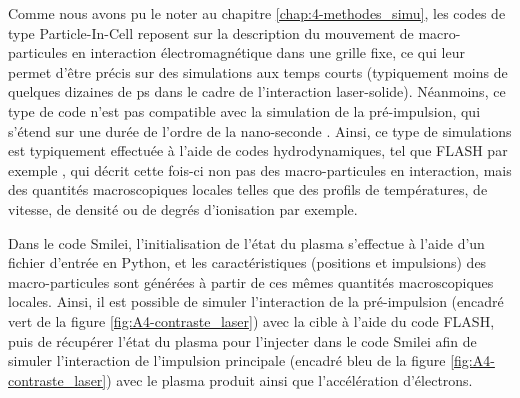 Comme nous avons pu le noter au chapitre \ref{chap:4-methodes_simu}, les codes de type Particle-In-Cell reposent sur la description du mouvement de macro-particules en interaction électromagnétique dans une grille fixe, ce qui leur permet d'être précis sur des simulations aux temps courts (typiquement moins de quelques dizaines de ps dans le cadre de l'interaction laser-solide). Néanmoins, ce type de code n'est pas compatible avec la simulation de la pré-impulsion, qui s'étend sur une durée de l'ordre de la nano-seconde \parencite{thaury_2007}. Ainsi, ce type de simulations est typiquement effectuée à l'aide de codes hydrodynamiques, tel que FLASH par exemple \parencite{fryxell_2000}, qui décrit cette fois-ci non pas des macro-particules en interaction, mais des quantités macroscopiques locales telles que des profils de températures, de vitesse, de densité ou de degrés d'ionisation par exemple. 

Dans le code Smilei, l'initialisation de l'état du plasma s'effectue à l'aide d'un fichier d'entrée en Python, et les caractéristiques (positions et impulsions) des macro-particules sont générées à partir de ces mêmes quantités macroscopiques locales. Ainsi, il est possible de simuler l'interaction de la pré-impulsion (encadré vert de la figure \ref{fig:A4-contraste_laser}) avec la cible à l'aide du code FLASH, puis de récupérer l'état du plasma pour l'injecter dans le code Smilei afin de simuler l'interaction de l'impulsion principale (encadré bleu de la figure \ref{fig:A4-contraste_laser}) avec le plasma produit ainsi que l'accélération d'électrons.

